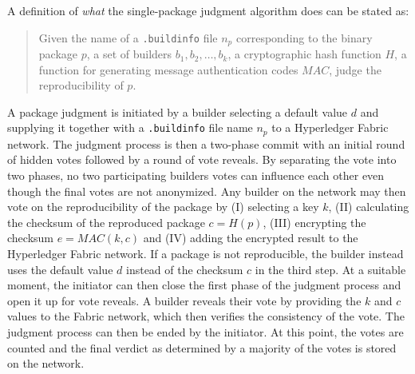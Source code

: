 A definition of \textit{what} the single-package judgment algorithm does can be stated as:

\begin{quote}
	Given the name of a \texttt{.buildinfo} file $n_p$ corresponding to the binary package $p$, a set of builders $b_1, b_2, \dotsc, b_k$, a cryptographic hash function $H$, a function for generating message authentication codes $MAC$, judge the reproducibility of $p$.
\end{quote}

A package judgment is initiated by a builder selecting a default value $d$ and supplying it together with a \texttt{.buildinfo} file name $n_p$ to a Hyperledger Fabric network. The judgment process is then a two-phase commit with an initial round of hidden votes followed by a round of vote reveals. By separating the vote into two phases, no two participating builders votes can influence each other even though the final votes are not anonymized. Any builder on the network may then vote on the reproducibility of the package by (I) selecting a key $k$, (II) calculating the checksum of the reproduced package $c = H(p)$, (III) encrypting the checksum $e = MAC(k, c)$ and (IV) adding the encrypted result to the Hyperledger Fabric network. If a package is not reproducible, the builder instead uses the default value $d$ instead of the checksum $c$ in the third step. At a suitable moment, the initiator can then close the first phase of the judgment process and open it up for vote reveals. A builder reveals their vote by providing the $k$ and $c$ values to the Fabric network, which then verifies the consistency of the vote. The judgment process can then be ended by the initiator. At this point, the votes are counted and the final verdict as determined by a majority of the votes is stored on the network.